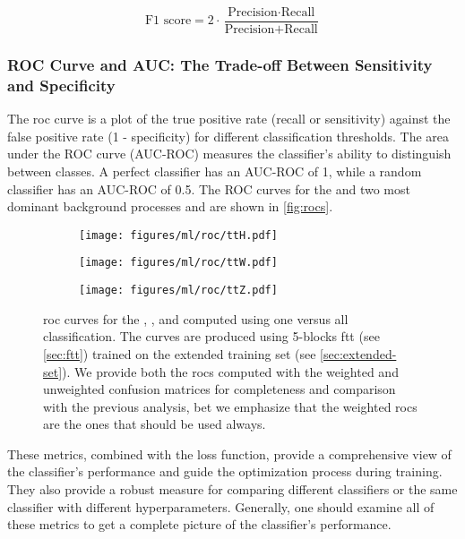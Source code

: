 \begin{equation}
    \text{F1 score} = 2 \cdot \frac{\text{Precision} \cdot \text{Recall}}{\text{Precision} + \text{Recall}}
\end{equation}

\subsubsection{ROC Curve and AUC: The Trade-off Between Sensitivity and Specificity}

The \gls{roc} curve is a plot of the true positive rate (recall or sensitivity) against
the false positive rate (1 - specificity) for different classification thresholds. The area under the ROC curve
(AUC-ROC) measures the classifier's ability to distinguish between classes. A perfect classifier has an AUC-ROC of 1,
while a random classifier has an AUC-ROC of 0.5. The ROC curves for the \tth and two most dominant background processes
\ttw and \ttz are shown in \autoref{fig:rocs}.

\begin{figure}[htb]
    \centering
    \begin{subfigure}{0.32\textwidth}
        \texttt{[image: figures/ml/roc/ttH.pdf]}
        \caption{\tth}
        \label{fig:roc-tth}
    \end{subfigure}
    \begin{subfigure}{0.32\textwidth}
        \texttt{[image: figures/ml/roc/ttW.pdf]}
        \caption{\ttw}
        \label{fig:roc-ttw}
    \end{subfigure}
    \begin{subfigure}{0.32\textwidth}
        \texttt{[image: figures/ml/roc/ttZ.pdf]}
        \caption{\ttz}
        \label{fig:roc-ttz}
    \end{subfigure}
    \caption[\acrshort{roc} curves for \tth, \ttz, and \ttz]
    {\gls{roc} curves for the \tth, \ttw, and \ttz computed using one versus all classification. The curves are produced
        using 5-blocks \gls{ftt} (see \autoref{sec:ftt}) trained on the extended training set (see
        \autoref{sec:extended-set}). We provide both the \glspl{roc} computed with the weighted and unweighted confusion
        matrices for completeness and comparison with the previous analysis, bet we emphasize
        that the weighted \glspl{roc} are the ones that should be used always.} \label{fig:rocs}
\end{figure}


These metrics, combined with the loss function, provide a comprehensive view of the classifier's performance and guide
the optimization process during training. They also provide a robust measure for comparing different classifiers or the
same classifier with different hyperparameters. Generally, one should examine all of these metrics to get a complete
picture of the classifier's performance.
